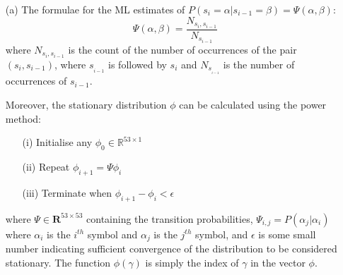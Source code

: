 \documentclass[12pt]{article}
\begin{document}
\begin{enumerate}

%
%
%
%


\item[(a)] The formulae for the ML estimates of $P(s_i = \alpha |s_{i-1} = \beta) = \Psi(\alpha, \beta)$:
$$\Psi(\alpha, \beta) = \frac{N_{s_i, s_{i-1}}}{N_{s_{i-1}}}$$
where $N_{s_i, s_{i-1}}$ is the count of the number of occurrences of the pair $(s_i, s_{i-1})$, where $s__{i-1}$ is followed by $s_{i}$ and $N_{s__{i-1}}$ is the number of occurrences of $s_{i-1}$.

Moreover, the stationary distribution $\phi$ can be calculated using the power method:
\begin{enumerate}
  \item[(i)] Initialise any $\phi_0 \in \mathbb{R}^{53 \times 1}$
  \item[(ii)] Repeat $\phi_{i+1} = \Psi \phi_{i}$
  \item[(iii)] Terminate when $\phi_{i+1} - \phi_{i} < \epsilon$
\end{enumerate}

where $\Psi \in \mathbf{R}^{53\times53}$ containing the transition probabilities, $\Psi_{i, j} = P(\alpha_j | \alpha_i)$ where $\alpha_i$ is the $i^{th}$ symbol and $\alpha_j$ is the $j^{th}$ symbol, and $\epsilon$ is some small number indicating sufficient convergence of the distribution to be considered stationary. The function $\phi(\gamma)$ is simply the index of $\gamma$ in the vector $\phi$.


\end{enumerate}
\end{document}
